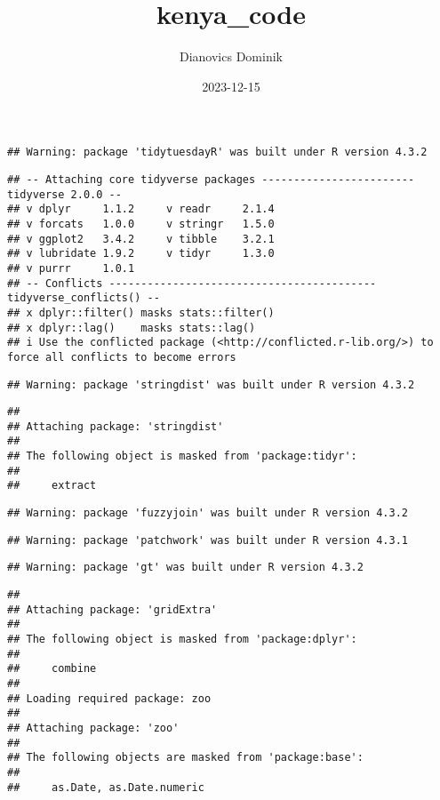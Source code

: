 \documentclass[
]{article}
\title{kenya\_code}
\author{Dianovics Dominik}
\date{2023-12-15}
\begin{document}
\maketitle

\begin{verbatim}
## Warning: package 'tidytuesdayR' was built under R version 4.3.2
\end{verbatim}

\begin{verbatim}
## -- Attaching core tidyverse packages ------------------------ tidyverse 2.0.0 --
## v dplyr     1.1.2     v readr     2.1.4
## v forcats   1.0.0     v stringr   1.5.0
## v ggplot2   3.4.2     v tibble    3.2.1
## v lubridate 1.9.2     v tidyr     1.3.0
## v purrr     1.0.1     
## -- Conflicts ------------------------------------------ tidyverse_conflicts() --
## x dplyr::filter() masks stats::filter()
## x dplyr::lag()    masks stats::lag()
## i Use the conflicted package (<http://conflicted.r-lib.org/>) to force all conflicts to become errors
\end{verbatim}

\begin{verbatim}
## Warning: package 'stringdist' was built under R version 4.3.2
\end{verbatim}

\begin{verbatim}
## 
## Attaching package: 'stringdist'
## 
## The following object is masked from 'package:tidyr':
## 
##     extract
\end{verbatim}

\begin{verbatim}
## Warning: package 'fuzzyjoin' was built under R version 4.3.2
\end{verbatim}

\begin{verbatim}
## Warning: package 'patchwork' was built under R version 4.3.1
\end{verbatim}

\begin{verbatim}
## Warning: package 'gt' was built under R version 4.3.2
\end{verbatim}

\begin{verbatim}
## 
## Attaching package: 'gridExtra'
## 
## The following object is masked from 'package:dplyr':
## 
##     combine
## 
## Loading required package: zoo
## 
## Attaching package: 'zoo'
## 
## The following objects are masked from 'package:base':
## 
##     as.Date, as.Date.numeric
\end{verbatim}
\end{document}
